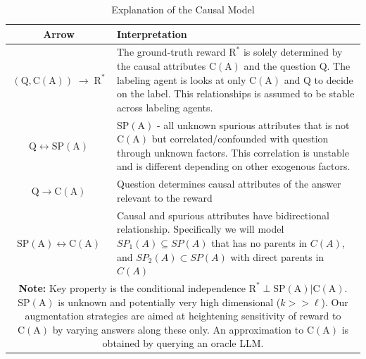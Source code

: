 \begin{table}[t!]
\centering
\caption{Explanation of the Causal Model}
\label{tab:causal_arrows}
\vspace{1em}
\begin{tabular}{c|p{9cm}} %
\toprule
\textbf{Arrow} & \textbf{Interpretation} \\
\midrule
$(\mathrm{Q}, \mathrm{C}(\mathrm{A})) \;\to\; \mathrm{R}^*$ & The ground-truth reward $\mathrm{R}^*$ is solely determined by the causal attributes $\mathrm{C(A)}$ and the question $\mathrm{Q}$. The labeling agent is looks  at only $\mathrm{C(A)}$ and $\mathrm{Q}$ to decide on the label. This relationships is assumed to be stable across labeling agents. \\
$\mathrm{Q}\leftrightarrow \mathrm{SP(A)}$  & $\mathrm{SP(A)}$ - all unknown spurious attributes that is not $\mathrm{C(A)}$ but correlated/confounded with question through unknown factors. This correlation is unstable and is different depending on other exogenous factors.  \\
$\mathrm{Q}\rightarrow \mathrm{C(A)}$ & Question determines causal attributes of the answer relevant to the reward \\
$\mathrm{SP(A)} \leftrightarrow \mathrm{C(A)}$ & Causal and spurious attributes have bidirectional relationship. Specifically we will model $SP_1(A) \subseteq SP(A)$ that has no parents in $C(A)$, and $SP_2(A) \subset SP(A)$ with direct parents in $C(A)$ \\

\midrule
\multicolumn{2}{p{12cm}}{\textbf{Note:} Key property is the conditional independence $\mathrm{R^*} \perp \mathrm{SP(A)} | \mathrm{C(A)}$. $\mathrm{SP(A)}$ is unknown and potentially very high dimensional ($k >> \ell$). Our augmentation strategies are aimed at heightening sensitivity of reward to $\mathrm{C(A)}$ by varying answers along these only. An approximation to $\mathrm{C(A)}$ is obtained by querying an oracle LLM.  } \\
\bottomrule
\end{tabular}
\end{table} 



\vspace{-0.05in}
